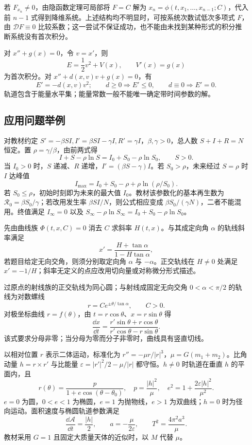 若 $F_{x_n}\ne0$，由隐函数定理可局部将 $F=C$ 解为 $x_n=\phi(t,x_1,\ldots,x_{n-1};C)$，代入前 $n-1$ 式得到降维系统。上述结构均不明显时，可按系统次数试低次多项式 $F$，由 $\mathcal DF\equiv0$ 比较系数；这一尝试不保证成功，也不能由未找到某种形式的积分推断系统没有首次积分。

对 $x''+g(x)=0$，令 $v=x'$，则
\[
E=\frac12v^2+V(x),\qquad V'(x)=g(x)
\]
为首次积分。对 $x''+d(x,v)v+g(x)=0$，有
\[
E'=-d(x,v)v^2;\qquad d\ge0\Rightarrow E'\le0,\qquad d\equiv0\Rightarrow E'=0.
\]
轨道包含于能量水平集；能量常数一般不能唯一确定带时间参数的解。

\subsection{应用问题举例}
对教材约定 $S'=-\beta SI,I'=\beta SI-\gamma I,R'=\gamma I$，$\beta,\gamma>0$，总人数 $S+I+R=N$ 恒定。置 $\rho=\gamma/\beta$，由前两式得
\[
I+S-\rho\ln S=I_0+S_0-\rho\ln S_0,\qquad S>0.
\]
当 $I_0>0$ 时，$S$ 递减、$R$ 递增，$I'=(\beta S-\gamma)I$。若 $S_0>\rho$，未来经过 $S=\rho$ 时 $I$ 达峰值
\[
I_{\max}=I_0+S_0-\rho+\rho\ln(\rho/S_0).
\]
若 $S_0\le\rho$，初始时刻即为未来的最大值 $I_0$。教材该参数化的基本再生数为 $\mathcal R_0=\beta S_0/\gamma$；若改用发生率 $\beta SI/N$，则公式相应变成 $\beta S_0/(\gamma N)$，二者不能混用。终值满足 $I_\infty=0$ 以及 $S_\infty-\rho\ln S_\infty=I_0+S_0-\rho\ln S_0$。

先由曲线族 $\Phi(t,x,C)=0$ 消去 $C$ 求斜率 $H(t,x)$。与其成定向角 $\alpha$ 的轨线斜率满足
\[
x'=\frac{H+\tan\alpha}{1-H\tan\alpha},
\]
若题目给定无向交角，则须分别取定向角 $\alpha$ 与 $-\alpha$。正交轨线在 $H\ne0$ 处满足 $x'=-1/H$；斜率无定义的点应改用切向量或对称微分形式描述。

过原点的射线族的正交轨线为同心圆；与射线成固定无向交角 $0<\alpha<\pi/2$ 的轨线为对数螺线
\[
r=Ce^{\pm\theta/\tan\alpha},\qquad C>0.
\]
对极坐标曲线 $r=f(\theta)$，由 $t=r\cos\theta$、$x=r\sin\theta$ 得
\[
\frac{\dd x}{\dd t}=\frac{r'\sin\theta+r\cos\theta}{r'\cos\theta-r\sin\theta}.
\]
该式要求分母非零；当分母为零而分子非零时，曲线具有竖直切线。

以相对位置 $r$ 表示二体运动，标准化为 $r''=-\mu r/|r|^3$，$\mu=G(m_1+m_2)$。比角动量 $h=r\times r'$ 与比能量 $\varepsilon=|r'|^2/2-\mu/|r|$ 都守恒。$h\ne0$ 时轨道在垂直 $h$ 的平面内，且
\[
r(\theta)=\frac{p}{1+e\cos(\theta-\theta_0)},\quad
p=\frac{|h|^2}{\mu},\quad e^2=1+\frac{2\varepsilon|h|^2}{\mu^2}.
\]
$e=0$ 为圆，$0<e<1$ 为椭圆，$e=1$ 为抛物线，$e>1$ 为双曲线；$h=0$ 时为径向运动。面积速度与椭圆轨道参数满足
\[
\frac{\dd\mathcal A}{\dd t}=\frac{|h|}{2},\qquad
a=-\frac{\mu}{2\varepsilon},\qquad T^2=\frac{4\pi^2a^3}{\mu}.
\]
教材采用 $G=1$ 且固定大质量天体的近似时，以 $M$ 代替 $\mu$。

